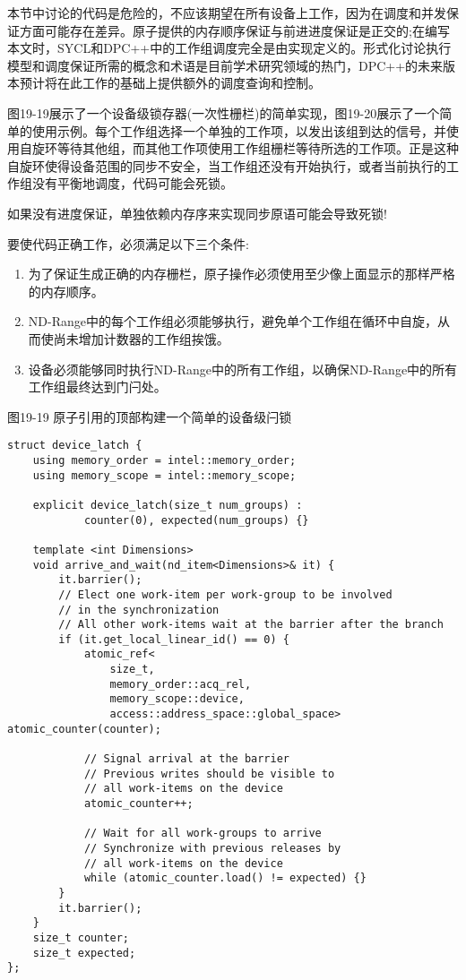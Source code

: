本节中讨论的代码是危险的，不应该期望在所有设备上工作，因为在调度和并发保证方面可能存在差异。原子提供的内存顺序保证与前进进度保证是正交的;在编写本文时，SYCL和DPC++中的工作组调度完全是由实现定义的。形式化讨论执行模型和调度保证所需的概念和术语是目前学术研究领域的热门，DPC++的未来版本预计将在此工作的基础上提供额外的调度查询和控制。\par

图19-19展示了一个设备级锁存器(一次性栅栏)的简单实现，图19-20展示了一个简单的使用示例。每个工作组选择一个单独的工作项，以发出该组到达的信号，并使用自旋环等待其他组，而其他工作项使用工作组栅栏等待所选的工作项。正是这种自旋环使得设备范围的同步不安全，当工作组还没有开始执行，或者当前执行的工作组没有平衡地调度，代码可能会死锁。\par

\begin{tcolorbox}[colback=red!5!white,colframe=red!75!black]
如果没有进度保证，单独依赖内存序来实现同步原语可能会导致死锁!
\end{tcolorbox}

要使代码正确工作，必须满足以下三个条件:\par

\begin{enumerate}
	\item 为了保证生成正确的内存栅栏，原子操作必须使用至少像上面显示的那样严格的内存顺序。
	\item ND-Range中的每个工作组必须能够执行，避免单个工作组在循环中自旋，从而使尚未增加计数器的工作组挨饿。
	\item 设备必须能够同时执行ND-Range中的所有工作组，以确保ND-Range中的所有工作组最终达到门闩处。
\end{enumerate}

\hspace*{\fill} \par %
图19-19 原子引用的顶部构建一个简单的设备级闩锁
\begin{lstlisting}[caption={}]
struct device_latch {
	using memory_order = intel::memory_order;
	using memory_scope = intel::memory_scope;
	
	explicit device_latch(size_t num_groups) :
			counter(0), expected(num_groups) {}
			
	template <int Dimensions>
	void arrive_and_wait(nd_item<Dimensions>& it) {
		it.barrier();
		// Elect one work-item per work-group to be involved
		// in the synchronization
		// All other work-items wait at the barrier after the branch
		if (it.get_local_linear_id() == 0) {
			atomic_ref<
				size_t,
				memory_order::acq_rel,
				memory_scope::device,
				access::address_space::global_space> atomic_counter(counter);
				
			// Signal arrival at the barrier
			// Previous writes should be visible to 
			// all work-items on the device
			atomic_counter++;
			
			// Wait for all work-groups to arrive
			// Synchronize with previous releases by
			// all work-items on the device
			while (atomic_counter.load() != expected) {}
		}
		it.barrier();
	}
	size_t counter;
	size_t expected;
};
\end{lstlisting}

